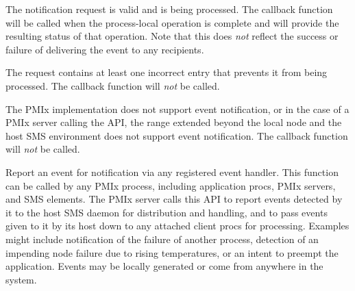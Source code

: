 \begin{arglist}
\end{arglist}

\begin{constantdesc}
\item {} The notification request is valid and is being processed. The callback function will be called when the process-local operation is complete and will provide the resulting status of that operation. Note that this does \textit{not} reflect the success or failure of delivering the event to any recipients.
\item {} The request contains at least one incorrect entry that prevents it from being processed. The callback function will \textit{not} be called.
\item {} The \ac{PMIx} implementation does not support event notification, or in the case of a \ac{PMIx} server calling the API, the range extended beyond the local node and the host \ac{SMS} environment does not support event notification. The callback function will \textit{not} be called.
\end{constantdesc}

\descr

Report an event for notification via any
registered event handler. This function can be called by any \ac{PMIx} process, including application procs, \ac{PMIx} servers, and \ac{SMS} elements. The \ac{PMIx} server calls this \ac{API} to report events detected
by it to the host \ac{SMS} daemon for distribution and handling, and to pass events given to it by its host down to any attached client procs for processing. Examples might include notification of the failure of another process, detection of an impending node failure due to rising temperatures, or an intent to preempt the application. Events may be locally generated or come from anywhere in the system.

